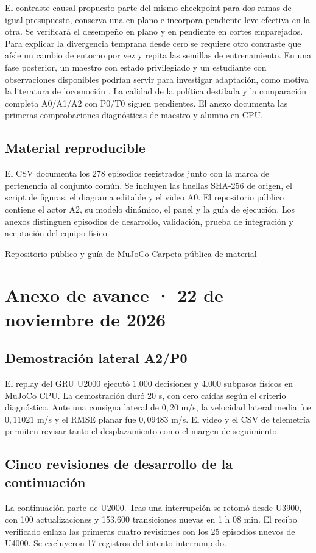 \documentclass[11pt]{article}
\begin{document}
El contraste causal propuesto parte del mismo checkpoint para dos ramas de igual presupuesto, conserva una en plano e incorpora pendiente leve efectiva en la otra. Se verificará el desempeño en plano y en pendiente en cortes emparejados. Para explicar la divergencia temprana desde cero se requiere otro contraste que aísle un cambio de entorno por vez y repita las semillas de entrenamiento. En una fase posterior, un maestro con estado privilegiado y un estudiante con observaciones disponibles podrían servir para investigar adaptación, como motiva la literatura de locomoción \cite{kumar2021}. La calidad de la política destilada y la comparación completa A0/A1/A2 con P0/T0 siguen pendientes. El anexo documenta las primeras comprobaciones diagnósticas de maestro y alumno en CPU.

\subsection*{Material reproducible}
El CSV documenta los 278 episodios registrados junto con la marca de pertenencia al conjunto común. Se incluyen las huellas SHA-256 de origen, el script de figuras, el diagrama editable y el video A0. El repositorio público contiene el actor A2, su modelo dinámico, el panel y la guía de ejecución. Los anexos distinguen episodios de desarrollo, validación, prueba de integración y aceptación del equipo físico.

\href{\repo}{Repositorio público y guía de MuJoCo}\quad
\href{https://drive.google.com/drive/folders/1S8uEebuWrVEXju7h-1b8J_P_9BeeqBDS}{Carpeta pública de material}


\newpage
\section*{Anexo de avance · 22 de noviembre de 2026}

\subsection*{Demostración lateral A2/P0}
El replay del GRU U2000 ejecutó 1.000 decisiones y 4.000 subpasos físicos en MuJoCo CPU. La demostración duró 20 s, con cero caídas según el criterio diagnóstico. Ante una consigna lateral de \(0{,}20\) m/s, la velocidad lateral media fue \(0{,}11021\) m/s y el RMSE planar fue \(0{,}09483\) m/s. El video y el CSV de telemetría permiten revisar tanto el desplazamiento como el margen de seguimiento.

\subsection*{Cinco revisiones de desarrollo de la continuación}
La continuación parte de U2000. Tras una interrupción se retomó desde U3900, con 100 actualizaciones y 153.600 transiciones nuevas en 1 h 08 min. El recibo verificado enlaza las primeras cuatro revisiones con los 25 episodios nuevos de U4000. Se excluyeron 17 registros del intento interrumpido.
\end{document}
